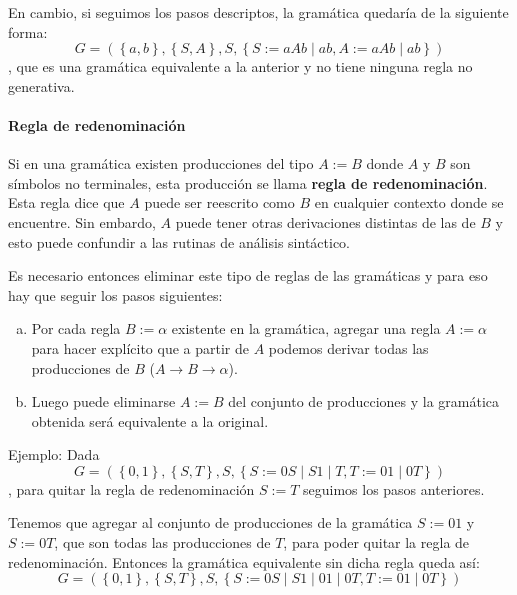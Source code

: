 \documentclass[12pt]{article}
\begin{document}
En cambio, si seguimos los pasos descriptos, la gramática quedaría de la siguiente forma:
\[
G = \left(\left\{a,b\right\}, \left\{S,A\right\},S,\left\{S:=aAb \mid ab, A:=aAb \mid ab\right\}\right)
\]
, que es una gramática equivalente a la anterior y no tiene ninguna regla no generativa.

\paragraph{Regla de redenominación}\mbox{}

Si en una gramática existen producciones del tipo $ A:=B $ donde $ A $ y $ B $ son símbolos no terminales, esta producción se llama \textbf{regla de redenominación}. Esta regla dice que $ A $ puede ser reescrito como $ B $ en cualquier contexto donde se encuentre. Sin embardo, $ A $ puede tener otras derivaciones distintas de las de $ B $ y esto puede confundir a las rutinas de análisis sintáctico.

Es necesario entonces eliminar este tipo de reglas de las gramáticas y para eso hay que seguir los pasos siguientes:
\begin{enumerate}[a)]
  \item Por cada regla $ B:=\alpha $ existente en la gramática, agregar una regla $ A:=\alpha $ para hacer explícito que a partir de $ A $ podemos derivar todas las producciones de $ B $ ($ A \to B \to \alpha $).

  \item Luego puede eliminarse $ A:=B $ del conjunto de producciones y la gramática obtenida será equivalente a la original.
\end{enumerate}

Ejemplo: Dada
\[
	G = \left(\left\{0,1\right\},\left\{S,T\right\},S,\left\{S:=0S \mid S1 \mid T, T:=01 \mid 0T\right\}\right)
\]
, para quitar la regla de redenominación $ S:=T $ seguimos los pasos anteriores.

Tenemos que agregar al conjunto de producciones de la gramática $ S:=01 $ y $ S:=0T $, que son todas las producciones de $ T $, para poder quitar la regla de redenominación. Entonces la gramática equivalente sin dicha regla queda así:
\[
G = \left(\left\{0,1\right\},\left\{S,T\right\},S,\left\{S:=0S \mid S1 \mid 01 \mid 0T, T:=01 \mid 0T\right\}\right)
\]

\vspace{0.2cm}
\end{document}
